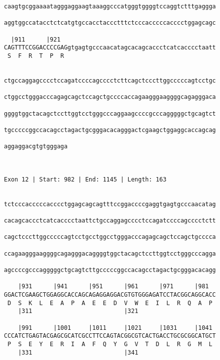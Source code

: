 \documentclass{article}
\begin{document}
\begin{Verbatim}
caagtgcggaaaatagggaggaagtaaaggcccatgggtggggtccaggtctttgaggga
                                                            
aggtggccatacctctcatgtgccacctaccctttctcccacccccacccctggagcagc
                                                            
  |911      |921                                            
CAGTTTCCGGACCCCGAGgtgagtgcccaacatagcacagcaccctcatcacccctaatt
 S  F  R  T  P  R                                           
                                                            
  
ctgccaggagcccctccagatccccagcccctcttcagctcccttggcccccagtcctgc
                                                            
ctggcctgggacccagagcagctccagctgccccaccagaagggaaggggcagagggaca
                                                            
ggggtggctacagctccttggtcctgggcccaggaagccccgcccagggggctgcagtct
                                                            
tgcccccggccacagcctagactgcgggacacagggactcgaagctggaggcaccagcag
                                                            
aggaggacgtgtgggaga
                  
                  
 
Exon 12 | Start: 982 | End: 1145 | Length: 163


tctcccacccccacccctggagcagcagtttccggaccccgaggtgagtgcccaacatag
                                                            
cacagcaccctcatcacccctaattctgccaggagcccctccagatccccagcccctctt
                                                            
cagctcccttggcccccagtcctgcctggcctgggacccagagcagctccagctgcccca
                                                            
ccagaagggaaggggcagagggacaggggtggctacagctccttggtcctgggcccagga
                                                            
agccccgcccagggggctgcagtcttgcccccggccacagcctagactgcgggacacagg
                                                            
    |931      |941      |951      |961      |971      |981  
GGACTCGAAGCTGGAGGCACCAGCAGAGGAGGACGTGTGGGAGATCCTACGGCAGGCACC
 D  S  K  L  E  A  P  A  E  E  D  V  W  E  I  L  R  Q  A  P 
    |311                          |321                      
  
    |991      |1001     |1011     |1021     |1031     |1041 
CCCATCTGAGTACGAGCGCATCGCCTTCCAGTACGGCGTCACTGACCTGCGCGGCATGCT
 P  S  E  Y  E  R  I  A  F  Q  Y  G  V  T  D  L  R  G  M  L 
    |331                          |341                      
  

\end{Verbatim}
\end{document}
